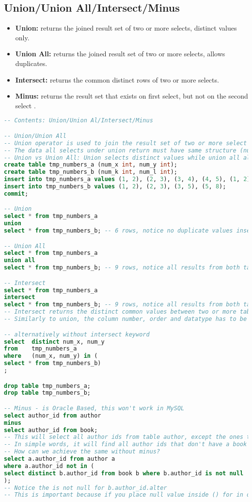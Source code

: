 \subsection{Union/Union All/Intersect/Minus}
\begin{itemize}
	\item \textbf{Union:} returns the joined result set of two or more selects, distinct values only.
	\item \textbf{Union All:} returns the joined result set of two or more selects, allows duplicates.
	\item \textbf{Intersect:} returns the common distinct rows of two or more selects.
	\item \textbf{Minus:} returns the result set that exists on first select, but not on the second select .
\end{itemize}
\begin{lstlisting}[language=SQL]
-- Contents: Union/Union Al/Intersect/Minus

-- Union/Union All
-- Union operator is used to join the result set of two or more select statements
-- The data all selects under union return must have same structure (number of columns, order and similar data types)
-- Union vs Union All: Union selects distinct values while union all allows duplicates
create table tmp_numbers_a (num_x int, num_y int);
create table tmp_numbers_b (num_k int, num_l int);
insert into tmp_numbers_a values (1, 2), (2, 3), (3, 4), (4, 5), (1, 2);
insert into tmp_numbers_b values (1, 2), (2, 3), (3, 5), (5, 8);
commit;

-- Union
select * from tmp_numbers_a
union
select * from tmp_numbers_b; -- 6 rows, notice no duplicate values inserted in the result set

-- Union All
select * from tmp_numbers_a
union all
select * from tmp_numbers_b; -- 9 rows, notice all results from both tables are inserted now, even duplicates

-- Intersect
select * from tmp_numbers_a
intersect
select * from tmp_numbers_b; -- 9 rows, notice all results from both tables are inserted now, even duplicates
-- Intersect returns the distinct common values between two or more tables
-- Similarly to union, the column number, order and datatype has to be the same

-- alternatively without intersect keyword
select	distinct num_x, num_y
from	tmp_numbers_a
where	(num_x, num_y) in (
select * from tmp_numbers_b)
;

drop table tmp_numbers_a;
drop table tmp_numbers_b;

-- Minus - is Oracle Based, this won't work in MySQL
select author_id from author
minus
select author_id from book;
-- This will select all author ids from table author, except the ones that exist in table book
-- In simple words, it will find all author ids that don't have a book
-- How can we achieve the same without minus?
select a.author_id from	author a
where a.author_id not in (
select distinct b.author_id from book b where b.author_id is not null
);
-- Notice the is not null for b.author_id.alter
-- This is important because if you place null value inside () for in or not in, then it will never show any results
\end{lstlisting}
